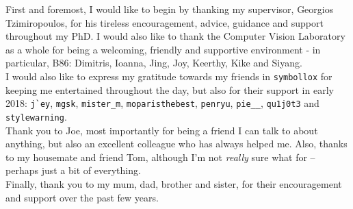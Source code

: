 
\begin{acknowledgements}

  First and foremost, I would like to begin by thanking my supervisor,
  Georgios Tzimiropoulos, for his tireless encouragement, advice,
  guidance and support throughout my PhD. I would also like to thank
  the Computer Vision Laboratory as a whole for being a welcoming,
  friendly and supportive environment - in particular, B86: Dimitris,
  Ioanna, Jing, Joy, Keerthy, Kike and Siyang.
  \\ [0.3em]

  \noindent I would also like to express my gratitude towards my
  friends in \verb|symbollox| for keeping me entertained throughout
  the day, but also for their support in early 2018: \verb|j`ey|,
  \verb|mgsk|, \verb|mister_m|, \verb|moparisthebest|, \verb|penryu|,
  \verb|pie__|, \verb|qu1j0t3| and \verb|stylewarning|.
  \\ [0.3em]

  \noindent Thank you to Joe, most importantly for being a friend I
  can talk to about anything, but also an excellent colleague who has
  always helped me. Also, thanks to my housemate and friend Tom,
  although I'm not \textit{really} sure what for -- perhaps just a bit
  of everything.
  \\ [0.3em]

  \noindent Finally, thank you to my mum, dad, brother and sister, for
  their encouragement and support over the past few years.



\end{acknowledgements}
